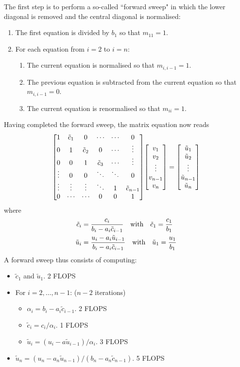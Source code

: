 \documentclass[reprint,english]{revtex4-1}
\begin{document}
The first step is to perform a so-called ``forward sweep" in which the lower diagonal is removed and the central diagonal is normalised:
\begin{enumerate}
\item The first equation is divided by \(b_1\) so that \(m_{11}=1\).
\item For each equation from \(i=2\) to \(i=n\):
\begin{enumerate}
	\item The current equation is normalised so that \(m_{i,i-1}=1\).
	\item The previous equation is subtracted from the current equation so that \(m_{i,i-1}=0\).
	\item The current equation is renormalised so that \(m_{ii}=1\).
\end{enumerate}
\end{enumerate}
\newpage
\noindent Having completed the forward sweep, the matrix equation now reads
\[\mqty[1 & \tilde{c}_1 & 0 & \cdots & \cdots & 0 \\
0 & 1 & \tilde{c}_2 & 0 & \cdots & \vdots \\
0 & 0 & 1 & \tilde{c}_3 & \cdots & \vdots \\
\vdots & 0 & 0 & \ddots & \ddots & 0 \\
\vdots & \vdots & \vdots & \ddots & 1 & \tilde{c}_{n-1} \\
0 & \cdots & \cdots & 0 & 0 & 1]\mqty[v_1 \\ v_2 \\ \vdots \\ v_{n-1} \\ v_n]=\mqty[\tilde{u}_1 \\ \tilde{u}_2 \\ \vdots \\ \tilde{u}_{n-1} \\ \tilde{u}_n]\]
where
\begin{align}
\tilde{c}_i&=\frac{c_i}{b_i-a_i\tilde{c}_{i-1}}\qq{with}\tilde{c}_1=\frac{c_1}{b_1}\\
\tilde{u}_i&=\frac{u_i-a_i\tilde{u}_{i-1}}{b_i-a_i\tilde{c}_{i-1}}\qq{with}\tilde{u}_1=\frac{u_1}{b_1}
\end{align}
A forward sweep thus consists of computing:
\begin{itemize}
\renewcommand\labelitemi{\(\times\)}
\renewcommand\labelitemii{\(\to\)}
\item \(\tilde{c}_1\) and \(\tilde{u}_1\). 2 FLOPS
\item For \(i=2,\ldots,n-1\): (\(n-2\) iterations)
	\begin{itemize}
	\item \(\alpha_i=b_i-a_i\tilde{c}_{i-1}\). 2 FLOPS
	\item \(\tilde{c}_i=c_i/\alpha_i\). 1 FLOPS
	\item \(\tilde{u}_i=(u_i-a\tilde{u}_{i-1})/\alpha_i\). 3 FLOPS
	\end{itemize}
\item \(\tilde{u}_n=(u_n-a_n\tilde{u}_{n-1})/(b_n-a_n\tilde{c}_{n-1})\). 5 FLOPS
\end{itemize}
\end{document}
